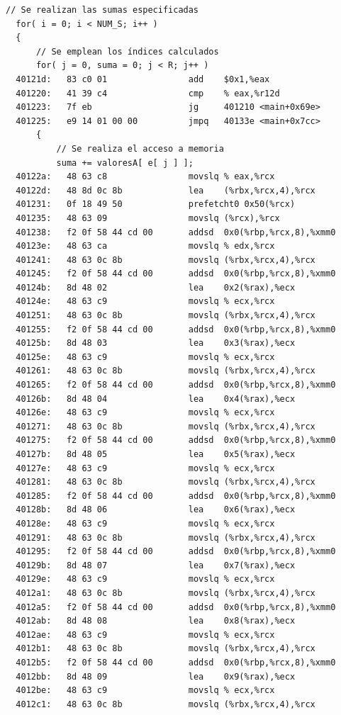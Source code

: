 \documentclass[conference]{IEEEtran}
\begin{document}
\begin{lstlisting}[style=customasm, basicstyle=\scriptsize, title=Traducción a ensamblador del bucle computacional del programa de pruebas incluyendo la precarga mediante software.]
  // Se realizan las sumas especificadas
  for( i = 0; i < NUM_S; i++ )
  {
      // Se emplean los índices calculados
      for( j = 0, suma = 0; j < R; j++ )
  40121d:	83 c0 01             	add    $0x1,%eax
  401220:	41 39 c4             	cmp    % eax,%r12d
  401223:	7f eb                	jg     401210 <main+0x69e>
  401225:	e9 14 01 00 00       	jmpq   40133e <main+0x7cc>
      {
          // Se realiza el acceso a memoria
          suma += valoresA[ e[ j ] ];
  40122a:	48 63 c8             	movslq % eax,%rcx
  40122d:	48 8d 0c 8b          	lea    (%rbx,%rcx,4),%rcx
  401231:	0f 18 49 50          	prefetcht0 0x50(%rcx)
  401235:	48 63 09             	movslq (%rcx),%rcx
  401238:	f2 0f 58 44 cd 00    	addsd  0x0(%rbp,%rcx,8),%xmm0
  40123e:	48 63 ca             	movslq % edx,%rcx
  401241:	48 63 0c 8b          	movslq (%rbx,%rcx,4),%rcx
  401245:	f2 0f 58 44 cd 00    	addsd  0x0(%rbp,%rcx,8),%xmm0
  40124b:	8d 48 02             	lea    0x2(%rax),%ecx
  40124e:	48 63 c9             	movslq % ecx,%rcx
  401251:	48 63 0c 8b          	movslq (%rbx,%rcx,4),%rcx
  401255:	f2 0f 58 44 cd 00    	addsd  0x0(%rbp,%rcx,8),%xmm0
  40125b:	8d 48 03             	lea    0x3(%rax),%ecx
  40125e:	48 63 c9             	movslq % ecx,%rcx
  401261:	48 63 0c 8b          	movslq (%rbx,%rcx,4),%rcx
  401265:	f2 0f 58 44 cd 00    	addsd  0x0(%rbp,%rcx,8),%xmm0
  40126b:	8d 48 04             	lea    0x4(%rax),%ecx
  40126e:	48 63 c9             	movslq % ecx,%rcx
  401271:	48 63 0c 8b          	movslq (%rbx,%rcx,4),%rcx
  401275:	f2 0f 58 44 cd 00    	addsd  0x0(%rbp,%rcx,8),%xmm0
  40127b:	8d 48 05             	lea    0x5(%rax),%ecx
  40127e:	48 63 c9             	movslq % ecx,%rcx
  401281:	48 63 0c 8b          	movslq (%rbx,%rcx,4),%rcx
  401285:	f2 0f 58 44 cd 00    	addsd  0x0(%rbp,%rcx,8),%xmm0
  40128b:	8d 48 06             	lea    0x6(%rax),%ecx
  40128e:	48 63 c9             	movslq % ecx,%rcx
  401291:	48 63 0c 8b          	movslq (%rbx,%rcx,4),%rcx
  401295:	f2 0f 58 44 cd 00    	addsd  0x0(%rbp,%rcx,8),%xmm0
  40129b:	8d 48 07             	lea    0x7(%rax),%ecx
  40129e:	48 63 c9             	movslq % ecx,%rcx
  4012a1:	48 63 0c 8b          	movslq (%rbx,%rcx,4),%rcx
  4012a5:	f2 0f 58 44 cd 00    	addsd  0x0(%rbp,%rcx,8),%xmm0
  4012ab:	8d 48 08             	lea    0x8(%rax),%ecx
  4012ae:	48 63 c9             	movslq % ecx,%rcx
  4012b1:	48 63 0c 8b          	movslq (%rbx,%rcx,4),%rcx
  4012b5:	f2 0f 58 44 cd 00    	addsd  0x0(%rbp,%rcx,8),%xmm0
  4012bb:	8d 48 09             	lea    0x9(%rax),%ecx
  4012be:	48 63 c9             	movslq % ecx,%rcx
  4012c1:	48 63 0c 8b          	movslq (%rbx,%rcx,4),%rcx

\end{lstlisting}
\end{document}
